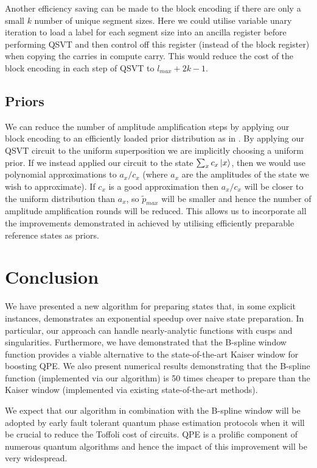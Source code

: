 \documentclass[a4paper,twocolumn,,accepted=2025-05-27]{quantumarticle}
\theoremstyle{empty}
\begin{document}
Another efficiency saving can be made to the block encoding if there are only a small $k$ number of unique segment sizes. Here we could utilise variable unary iteration to load a label for each segment size into an ancilla register before performing QSVT and then control off this register (instead of the block register) when copying the carries in compute carry. This would reduce the cost of the block encoding in each step of QSVT to $l_{max} + 2 k - 1$.

\subsection{Priors} We can reduce the number of amplitude amplification steps by applying our block encoding to an efficiently loaded prior distribution as in \cite{Lemieux:2024pmt, Babbush_2019}. By applying our QSVT circuit to the uniform superposition we are implicitly choosing a uniform prior. If we instead applied our circuit to the state $\sum_x c_x \ket{x}$, then we would use polynomial approximations to $a_x/c_x$ (where $a_x$ are the amplitudes of the state we wish to approximate). If $c_x$ is a good approximation then $a_x/c_x$ will be closer to the uniform distribution than $a_x$, so $\tilde{p}_{max}$ will be smaller and hence the number of amplitude amplification rounds will be reduced. This allows us to incorporate all the improvements demonstrated in \cite{Lemieux:2024pmt} achieved by utilising efficiently preparable reference states as priors.

\section{Conclusion}
We have presented a new algorithm for preparing states that, in some explicit instances, demonstrates an exponential speedup over naive state preparation. In particular, our approach can handle nearly-analytic functions with cusps and singularities. Furthermore, we have demonstrated that the B-spline window function provides a viable alternative to the state-of-the-art Kaiser window for boosting QPE. We also present numerical results demonstrating that the B-spline function (implemented via our algorithm) is 50 times cheaper to prepare than the Kaiser window (implemented via existing state-of-the-art methods).

We expect that our algorithm in combination with the B-spline window will be adopted by early fault tolerant quantum phase estimation protocols when it will be crucial to reduce the Toffoli cost of circuits. QPE is a prolific component of numerous quantum algorithms and hence the impact of this improvement will be very widespread.
\end{document}
